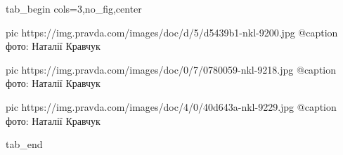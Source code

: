  
 
 
 
 


\ifcmt
  tab_begin cols=3,no_fig,center

     pic https://img.pravda.com/images/doc/d/5/d5439b1-nkl-9200.jpg
		 @caption фото: Наталії Кравчук

		 pic https://img.pravda.com/images/doc/0/7/0780059-nkl-9218.jpg
		 @caption фото: Наталії Кравчук

		 pic https://img.pravda.com/images/doc/4/0/40d643a-nkl-9229.jpg
		 @caption фото: Наталії Кравчук

  tab_end
\fi
